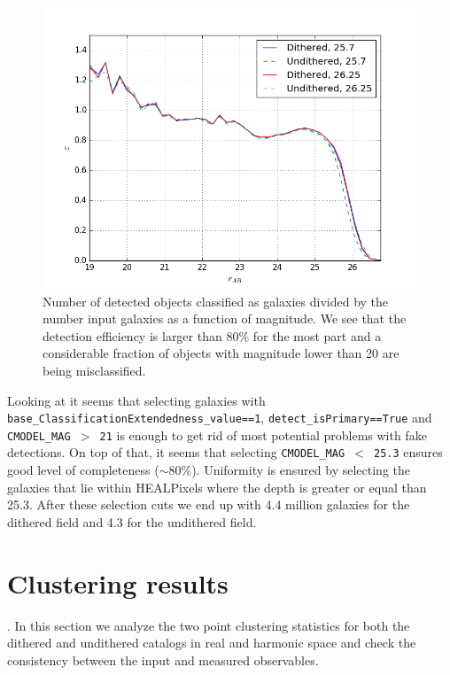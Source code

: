 \documentclass[\docopts]{\docclass}
\begin{document}
\begin{figure}
\centering
\includegraphics[width=0.9\columnwidth]{completeness.png}
\caption{Number of detected objects classified as galaxies divided by the number input galaxies as a function of magnitude. We see that the detection efficiency is larger than 80\% for the most part and a considerable fraction of objects with magnitude lower than 20 are being misclassified.}
\label{fig:completeness}
\end{figure}

Looking at  it seems that selecting galaxies with \texttt{base\_ClassificationExtendedness\_value==1}, \texttt{detect\_isPrimary==True} and \texttt{CMODEL\_MAG $>$ 21} is enough to get rid of most potential problems with fake detections. On top of that, it seems that selecting \texttt{CMODEL\_MAG $<$ 25.3} ensures good level of completeness ($\sim 80\%$). Uniformity is ensured by selecting the galaxies that lie within HEALPixels where the depth is greater or equal than 25.3. After these selection cuts we end up with 4.4 million galaxies for the dithered field and 4.3 for the undithered field. 

\section{Clustering results}
\label{sec:results}

. In this section we analyze the two point clustering statistics for both the dithered and undithered catalogs in real and harmonic space and check the consistency between the input and measured observables. 
\end{document}
